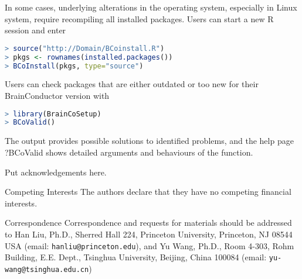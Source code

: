 \documentclass{nature}
\begin{document}
\begin{methods}
In some cases, underlying alterations in the operating system, especially in Linux system, require recompiling all installed packages. Users can start a new R session and enter
\begin{lstlisting}[language = R]
> source("http://Domain/BCoinstall.R")
> pkgs <- rownames(installed.packages())
> BCoInstall(pkgs, type="source")
\end{lstlisting}

Users can check packages that are either outdated or too new for their BrainConductor version with
\begin{lstlisting}[language = R]
> library(BrainCoSetup)
> BCoValid()
\end{lstlisting}
The output provides possible solutions to identified problems, and the help page ?BCoValid shows detailed arguments and behaviours of the function.
 
 



\end{methods}






\begin{addendum}
 \item Put acknowledgements here.
 \item[Competing Interests] The authors declare that they have no
competing financial interests.
 \item[Correspondence] Correspondence and requests for materials should be addressed to Han Liu, Ph.D., Sherred Hall 224, Princeton University, Princeton, NJ 08544 USA (email: \texttt{hanliu@princeton.edu}), and Yu Wang, Ph.D., Room 4-303, Rohm Building, E.E. Dept., Tsinghua University, Beijing, China 100084  (email: \texttt{yu-wang@tsinghua.edu.cn})
\end{addendum}

	
\end{document}
